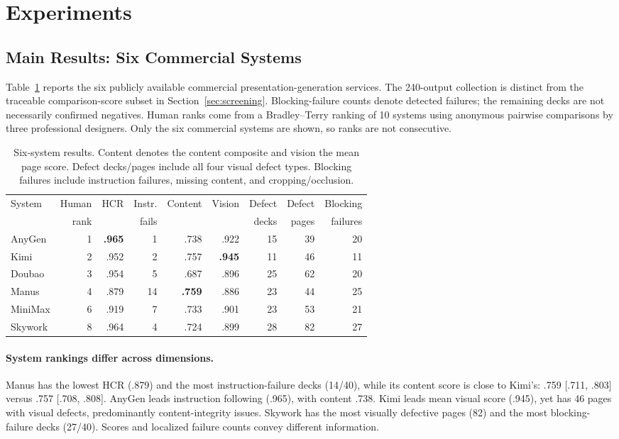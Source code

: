 \section{Experiments}
\subsection{Main Results: Six Commercial Systems}
Table~\ref{tab:main} reports the six publicly available commercial presentation-generation services. The 240-output collection is distinct from the traceable comparison-score subset in Section~\ref{sec:screening}. Blocking-failure counts denote detected failures; the remaining decks are not necessarily confirmed negatives. Human ranks come from a Bradley--Terry ranking of 10 systems using anonymous pairwise comparisons by three professional designers. Only the six commercial systems are shown, so ranks are not consecutive.

\begin{table}[t]
\caption{Six-system results. Content denotes the content composite and vision the mean page score. Defect decks/pages include all four visual defect types. Blocking failures include instruction failures, missing content, and cropping/occlusion.}
\label{tab:main}\centering\small
\setlength{\tabcolsep}{3pt}
\begin{tabular}{@{}lrrrrrrrr@{}}
\toprule
System & Human & HCR & Instr. & Content & Vision & Defect & Defect & Blocking\\
 & rank & & fails & & & decks & pages & failures\\\midrule
AnyGen & 1 & \textbf{.965} & 1 & .738 & .922 & 15 & 39 & 20\\
Kimi & 2 & .952 & 2 & .757 & \textbf{.945} & 11 & 46 & 11\\
Doubao & 3 & .954 & 5 & .687 & .896 & 25 & 62 & 20\\
Manus & 4 & .879 & 14 & \textbf{.759} & .886 & 23 & 44 & 25\\
MiniMax & 6 & .919 & 7 & .733 & .901 & 23 & 53 & 21\\
Skywork & 8 & .964 & 4 & .724 & .899 & 28 & 82 & 27\\\bottomrule
\end{tabular}
\end{table}

\paragraph{System rankings differ across dimensions.}
Manus has the lowest HCR (.879) and the most instruction-failure decks (14/40), while its content score is close to Kimi's: .759 [.711, .803] versus .757 [.708, .808]. AnyGen leads instruction following (.965), with content .738. Kimi leads mean visual score (.945), yet has 46 pages with visual defects, predominantly content-integrity issues. Skywork has the most visually defective pages (82) and the most blocking-failure decks (27/40). Scores and localized failure counts convey different information.

